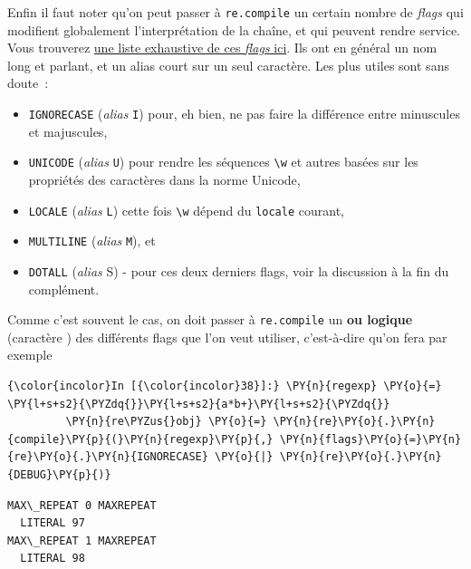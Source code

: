     Enfin il faut noter qu'on peut passer à \texttt{re.compile} un certain
nombre de \emph{flags} qui modifient globalement l'interprétation de la
chaîne, et qui peuvent rendre service.\\

    Vous trouverez
\href{https://docs.python.org/3/library/re.html\#module-contents}{une
liste exhaustive de ces \emph{flags} ici}. Ils ont en général un nom
long et parlant, et un alias court sur un seul caractère. Les plus
utiles sont sans doute~:

\begin{itemize}
	\item 
	\texttt{IGNORECASE} (\emph{alias} \texttt{I})
	pour, eh bien, ne pas faire la différence entre minuscules et
	majuscules,
	\item
	\texttt{UNICODE} (\emph{alias} \texttt{U}) pour rendre les
	séquences \texttt{\textbackslash{}w} et autres basées sur les propriétés
	des caractères dans la norme Unicode,
	\item
	\texttt{LOCALE} (\emph{alias}
	\texttt{L}) cette fois \texttt{\textbackslash{}w} dépend du
	\texttt{locale} courant,
	\item
	\texttt{MULTILINE} (\emph{alias} \texttt{M}), et
	\item
	\texttt{DOTALL} (\emph{alias} S) - pour ces deux derniers flags,
	voir la discussion à la fin du complément.
\end{itemize}

    Comme c'est souvent le cas, on doit passer à \texttt{re.compile} un
\textbf{ou logique} (caractère \texttt{\textbar{}}) des différents flags
que l'on veut utiliser, c'est-à-dire qu'on fera par exemple

    \begin{Verbatim}[commandchars=\\\{\}]
{\color{incolor}In [{\color{incolor}38}]:} \PY{n}{regexp} \PY{o}{=} \PY{l+s+s2}{\PYZdq{}}\PY{l+s+s2}{a*b+}\PY{l+s+s2}{\PYZdq{}}
         \PY{n}{re\PYZus{}obj} \PY{o}{=} \PY{n}{re}\PY{o}{.}\PY{n}{compile}\PY{p}{(}\PY{n}{regexp}\PY{p}{,} \PY{n}{flags}\PY{o}{=}\PY{n}{re}\PY{o}{.}\PY{n}{IGNORECASE} \PY{o}{|} \PY{n}{re}\PY{o}{.}\PY{n}{DEBUG}\PY{p}{)}
\end{Verbatim}


    \begin{Verbatim}[commandchars=\\\{\}]
MAX\_REPEAT 0 MAXREPEAT
  LITERAL 97
MAX\_REPEAT 1 MAXREPEAT
  LITERAL 98

    \end{Verbatim}

